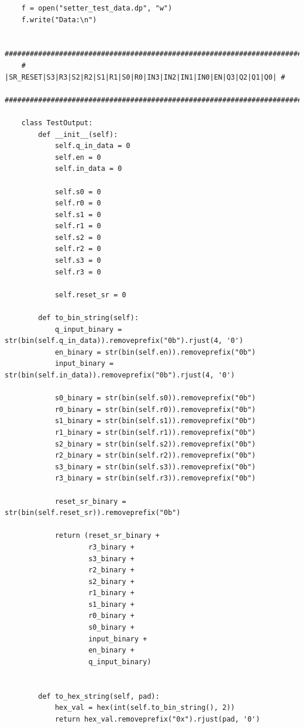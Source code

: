 \documentclass[a4paper]{article}
\begin{document}
\begin{verbatim}
    f = open("setter_test_data.dp", "w")
    f.write("Data:\n")

    ###############################################################################
    # |SR_RESET|S3|R3|S2|R2|S1|R1|S0|R0|IN3|IN2|IN1|IN0|EN|Q3|Q2|Q1|Q0| #
    ###############################################################################

    class TestOutput: 
        def __init__(self):
            self.q_in_data = 0
            self.en = 0
            self.in_data = 0
            
            self.s0 = 0
            self.r0 = 0
            self.s1 = 0
            self.r1 = 0
            self.s2 = 0
            self.r2 = 0
            self.s3 = 0
            self.r3 = 0

            self.reset_sr = 0

        def to_bin_string(self):
            q_input_binary = str(bin(self.q_in_data)).removeprefix("0b").rjust(4, '0')
            en_binary = str(bin(self.en)).removeprefix("0b")
            input_binary = str(bin(self.in_data)).removeprefix("0b").rjust(4, '0')
            
            s0_binary = str(bin(self.s0)).removeprefix("0b")
            r0_binary = str(bin(self.r0)).removeprefix("0b")
            s1_binary = str(bin(self.s1)).removeprefix("0b")
            r1_binary = str(bin(self.r1)).removeprefix("0b")
            s2_binary = str(bin(self.s2)).removeprefix("0b")
            r2_binary = str(bin(self.r2)).removeprefix("0b")
            s3_binary = str(bin(self.s3)).removeprefix("0b")
            r3_binary = str(bin(self.r3)).removeprefix("0b")
            
            reset_sr_binary = str(bin(self.reset_sr)).removeprefix("0b")

            return (reset_sr_binary + 
                    r3_binary + 
                    s3_binary + 
                    r2_binary + 
                    s2_binary + 
                    r1_binary + 
                    s1_binary + 
                    r0_binary + 
                    s0_binary + 
                    input_binary + 
                    en_binary +
                    q_input_binary)
        

        def to_hex_string(self, pad):
            hex_val = hex(int(self.to_bin_string(), 2))
            return hex_val.removeprefix("0x").rjust(pad, '0')



\end{verbatim}
\end{document}
